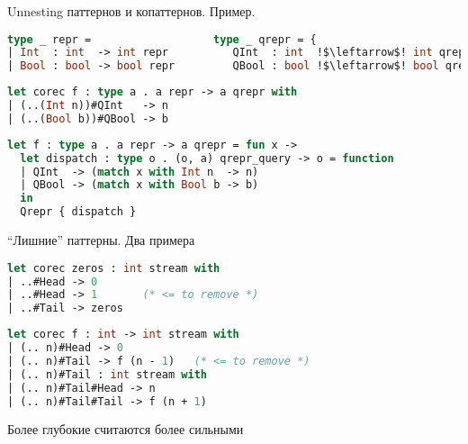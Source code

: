 \documentclass[10pt, mathserif]{beamer}
\theoremstyle{definition}
\begin{document}
\begin{frame}[fragile]{Unnesting паттернов и копаттернов. Пример.}
\begin{lstlisting}[language=ocaml,mathescape=true]
type _ repr =                   type _ qrepr = {
| Int  : int  -> int repr          QInt  : int  !$\leftarrow$! int qrepr;
| Bool : bool -> bool repr         QBool : bool !$\leftarrow$! bool qrepr }
\end{lstlisting}

\begin{lstlisting}[language=ocaml,mathescape=true]
let corec f : type a . a repr -> a qrepr with
| (..(Int n))#QInt   -> n
| (..(Bool b))#QBool -> b
\end{lstlisting}
\centering{$\Downarrow$}
\begin{lstlisting}[language=ocaml,mathescape=true]
let f : type a . a repr -> a qrepr = fun x ->
  let dispatch : type o . (o, a) qrepr_query -> o = function
  | QInt  -> (match x with Int n  -> n)
  | QBool -> (match x with Bool b -> b)
  in 
  Qrepr { dispatch }
\end{lstlisting}
\end{frame}


\begin{frame}[fragile]{``Лишние'' паттерны. Два примера}
\begin{lstlisting}[language=ocaml,mathescape=true]
let corec zeros : int stream with
| ..#Head -> 0
| ..#Head -> 1       (* <= to remove *)
| ..#Tail -> zeros
\end{lstlisting}
\pause
\begin{lstlisting}[language=ocaml,mathescape=true]
let corec f : int -> int stream with
| (.. n)#Head -> 0
| (.. n)#Tail -> f (n - 1)   (* <= to remove *)
| (.. n)#Tail : int stream with
| (.. n)#Tail#Head -> n
| (.. n)#Tail#Tail -> f (n + 1)
\end{lstlisting}
Более глубокие считаются более сильными
\end{frame}
\end{document}
